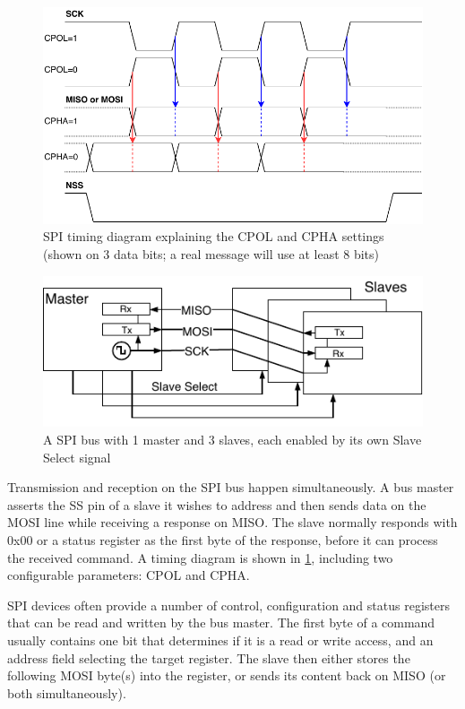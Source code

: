\begin{figure}[h]
	\centering
	\includegraphics[scale=.9] {img/spi-timing.pdf}
	\caption[SPI timing diagram]{\label{fig:spi_timing}SPI timing diagram explaining the CPOL and CPHA settings (shown on 3 data bits; a real message will use at least 8 bits)}
\end{figure}

\begin{figure}[h]
\centering
\includegraphics[scale=1.1] {img/spi-multislave-redraw.pdf}
\caption[SPI master with multiple slaves]{\label{fig:spi_multislave}A SPI bus with 1 master and 3 slaves, each enabled by its own Slave Select signal}
\end{figure}

Transmission and reception on the \gls{SPI} bus happen simultaneously. A bus master asserts the \gls{SS} pin of a slave it wishes to address and then sends data on the \gls{MOSI} line while receiving a response on \gls{MISO}. The slave normally responds with 0x00 or a status register as the first byte of the response, before it can process the received command. A timing diagram is shown in \cref{fig:spi_timing}, including two configurable parameters: \gls{CPOL} and \gls{CPHA}.

\gls{SPI} devices often provide a number of control, configuration and status registers that can be read and written by the bus master. The first byte of a command usually contains one bit that determines if it is a read or write access, and an address field selecting the target register. The slave then either stores the following \gls{MOSI} byte(s) into the register, or sends its content back on \gls{MISO} (or both simultaneously).

